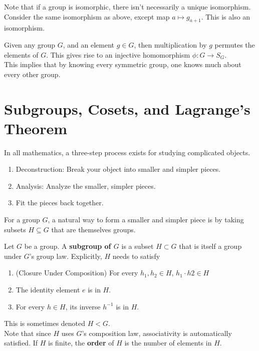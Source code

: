 \documentclass[math1530-lecture-notes]{subfiles}
\begin{document}
Note that if a group is isomorphic, there isn't necessarily a unique isomorphism. Consider the same
isomorphism as above, except map $a\mapsto g_{a+1}$. This is also an isomorphism.

\begin{example}
  Given any group $G$, and an element $g\in G$, then multiplication by $g$ permutes the elements of
  $G$. This gives rise to an injective homomorphism $\phi: G \to S_G$.\\

  This implies that by knowing every symmetric group, one knows much about every other group.
\end{example}

\section{Subgroups, Cosets, and Lagrange's Theorem}
In all mathematics, a three-step process exists for studying complicated objects. 
\begin{enumerate}
  \item Deconstruction: Break your object into smaller and simpler pieces.
  \item Analysis: Analyze the smaller, simpler pieces.
  \item Fit the pieces back together.
\end{enumerate}

For a group $G$, a natural way to form a smaller and simpler piece is by taking subsets 
$H\subseteq G$ that are themselves groups.

\begin{definition}[Subgroups]{}
  Let $G$ be a group. A \textbf{subgroup of $G$} is a subset $H\subset G$ that is itself a group
  under $G$'s group law. Explicitly, $H$ needs to satisfy
  \begin{enumerate}
    \item (Closure Under Composition) For every $h_1,h_2\in H$, $ h_1\cdot h2\in H$
    \item The identity element $e$ is in $H$.
    \item For every $h\in H$, its inverse $h^{-1}$ is in $H$.
  \end{enumerate}
  This is sometimes denoted $H < G$. \\

  Note that since $H$ uses $G$'s composition law, associativity is automatically satisfied. If $H$ 
  is finite, the \textbf{order}  of $H$ is the number of elements in $H$.
\end{definition}
\end{document}
